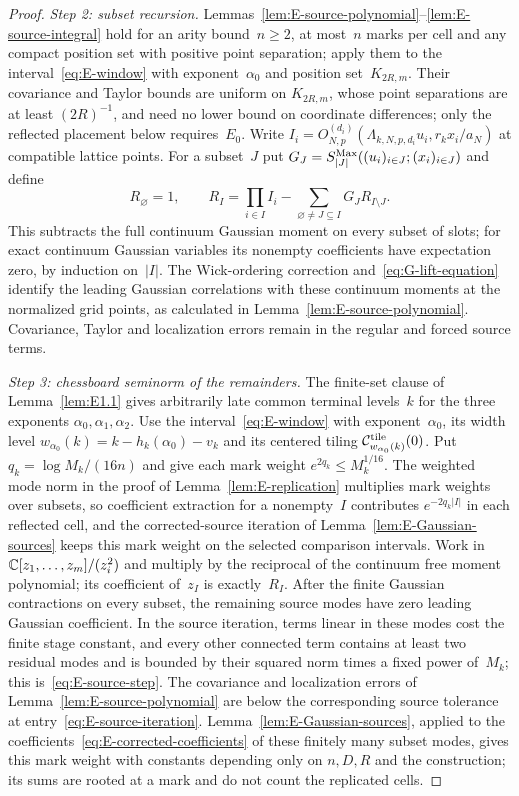 \begin{proof}
\emph{Step 2: subset recursion.} Lemmas~\ref{lem:E-source-polynomial}--\ref{lem:E-source-integral} hold for an arity bound~$n\ge2$, at most~$n$ marks per cell and any compact position set with positive point separation; apply them to the interval~\eqref{eq:E-window} with exponent~$\alpha_0$ and position set~$K_{2R,m}$. Their covariance and Taylor bounds are uniform on $K_{2R,m}$, whose point separations are at least $(2R)^{-1}$, and need no lower bound on coordinate differences; only the reflected placement below requires~$E_0$. Write $I_i=O_{N,p}^{(d_i)}(\Lambda_{k,N,p,d_i}u_i,r_kx_i/a_N)$ at compatible lattice points. For a subset~$J$ put $G_J=S_{|J|}^{\rm Max}((u_i)_{i\in J};(x_i)_{i\in J})$ and define
\begin{equation*}
R_\varnothing=1,\qquad
R_I=\prod_{i\in I}I_i-\sum_{\varnothing\ne J\subseteq I}G_JR_{I\setminus J}.
\end{equation*}
This subtracts the full continuum Gaussian moment on every subset of slots; for exact continuum Gaussian variables its nonempty coefficients have expectation zero, by induction on~$|I|$. The Wick-ordering correction and~\eqref{eq:G-lift-equation} identify the leading Gaussian correlations with these continuum moments at the normalized grid points, as calculated in Lemma~\ref{lem:E-source-polynomial}. Covariance, Taylor and localization errors remain in the regular and forced source terms.

\emph{Step 3: chessboard seminorm of the remainders.} The finite-set clause of Lemma~\ref{lem:E1.1} gives arbitrarily late common terminal levels~$k$ for the three exponents $\alpha_0,\alpha_1,\alpha_2$. Use the interval~\eqref{eq:E-window} with exponent~$\alpha_0$, its width level $w_{\alpha_0}(k)=k-h_k(\alpha_0)-v_k$ and its centered tiling $\mathcal C^{\rm tile}_{w_{\alpha_0}(k)}(0)$. Put $q_k=\log M_k/(16n)$ and give each mark weight $e^{2q_k}\le M_k^{1/16}$. The weighted mode norm in the proof of Lemma~\ref{lem:E-replication} multiplies mark weights over subsets, so coefficient extraction for a nonempty~$I$ contributes $e^{-2q_k|I|}$ in each reflected cell, and the corrected-source iteration of Lemma~\ref{lem:E-Gaussian-sources} keeps this mark weight on the selected comparison intervals. Work in $\mathbb{C}[z_1,\ldots,z_m]/(z_i^2)$ and multiply by the reciprocal of the continuum free moment polynomial; its coefficient of~$z_I$ is exactly~$R_I$. After the finite Gaussian contractions on every subset, the remaining source modes have zero leading Gaussian coefficient. In the source iteration, terms linear in these modes cost the finite stage constant, and every other connected term contains at least two residual modes and is bounded by their squared norm times a fixed power of~$M_k$; this is~\eqref{eq:E-source-step}. The covariance and localization errors of Lemma~\ref{lem:E-source-polynomial} are below the corresponding source tolerance at entry~\eqref{eq:E-source-iteration}. Lemma~\ref{lem:E-Gaussian-sources}, applied to the coefficients~\eqref{eq:E-corrected-coefficients} of these finitely many subset modes, gives this mark weight with constants depending only on $n,D,R$ and the construction; its sums are rooted at a mark and do not count the replicated cells.


\end{proof}
